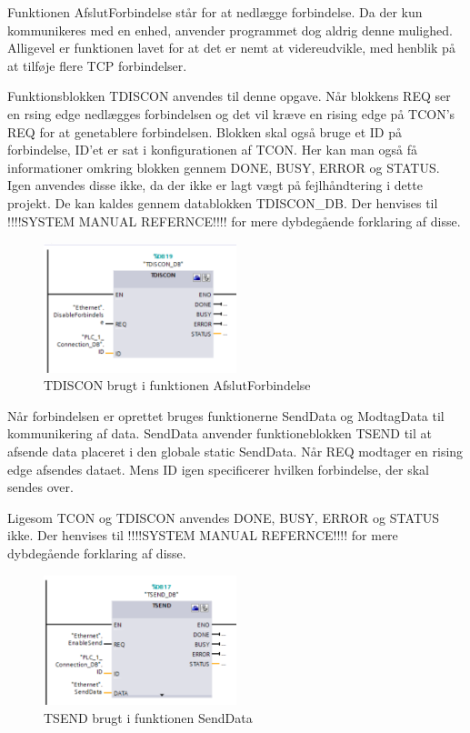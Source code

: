 Funktionen AfslutForbindelse står for at nedlægge forbindelse. Da der kun kommunikeres med en enhed, anvender programmet dog aldrig denne mulighed. Alligevel er funktionen lavet for at det er nemt at videreudvikle, med henblik på at tilføje flere TCP forbindelser. 

Funktionsblokken TDISCON anvendes til denne opgave. Når blokkens REQ ser en rsing edge nedlægges forbindelsen og det vil kræve en rising edge på TCON's REQ for at genetablere forbindelsen. Blokken skal også bruge et ID på forbindelse, ID'et er sat i konfigurationen af TCON. Her kan man også få informationer omkring blokken gennem DONE, BUSY, ERROR og STATUS. Igen anvendes disse ikke, da der ikke er lagt vægt på fejlhåndtering i dette projekt. De kan kaldes gennem datablokken TDISCON\_DB. Der henvises til !!!!SYSTEM MANUAL REFERNCE!!!! for mere dybdegående forklaring af disse.

\begin{figure}[H] %
	\centering
	\includegraphics[width=0.5\textwidth]{Figure/TDISCON}
	\caption{TDISCON brugt i funktionen AfslutForbindelse}
	\label{fig:TDISCON}
\end{figure}

Når forbindelsen er oprettet bruges funktionerne SendData og ModtagData til  kommunikering af data. SendData anvender funktioneblokken TSEND til at afsende data placeret i den globale static SendData. Når REQ modtager en rising edge afsendes dataet. Mens ID igen specificerer hvilken forbindelse, der skal sendes over.

Ligesom TCON og TDISCON anvendes DONE, BUSY, ERROR og STATUS ikke. Der henvises til !!!!SYSTEM MANUAL REFERNCE!!!! for mere dybdegående forklaring af disse.

\begin{figure}[H] %
	\centering
	\includegraphics[width=0.5\textwidth]{Figure/TSEND}
	\caption{TSEND brugt i funktionen SendData}
	\label{fig:TSEND}
\end{figure}

